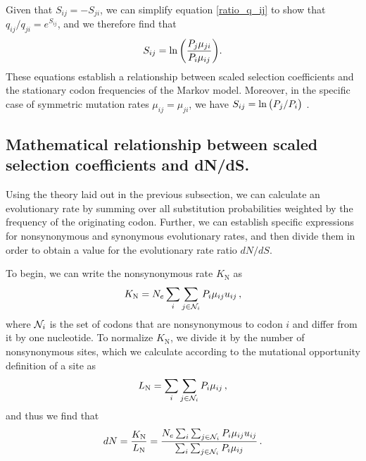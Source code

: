 \documentclass[11pt]{article}
\begin{document}
Given that $S_{ij} = -S_{ji}$, we can simplify equation \eqref{ratio_q_ij} to show that $q_{ij}/q_{ji} = e^{S_{ij}}$, and we therefore find that
\begin{equation}\label{eq:s_pmu}
S_{ij} = \ln\bigg{(} \frac{P_j\mu_{ji}}{P_i\mu_{ij}} \bigg{)}. 
\end{equation}
These equations establish a relationship between scaled selection coefficients and the stationary codon frequencies of the Markov model. Moreover, in the specific case of symmetric mutation rates $\mu_{ij} = \mu_{ji}$, we have $S_{ij} = \ln\big{(}P_j/P_i\big{)}$ \cite{SellaHirsh2005}. 


		
\subsection*{Mathematical relationship between scaled selection coefficients and dN/dS.} 

Using the theory laid out in the previous subsection, we can calculate an evolutionary rate by summing over all substitution probabilities weighted by the frequency of the originating codon. Further, we can establish specific expressions for nonsynonymous and synonymous evolutionary rates, and then divide them in order to obtain a value for the evolutionary rate ratio $dN/dS$.

To begin, we can write the nonsynonymous rate $K_\text{N}$ as 
\begin{equation}\label{eq:KN}
	K_\text{N} = N_e \sum_i \sum_{j \in {\cal N}_i} P_i \mu_{ij} u_{ij} \,,
\end{equation}
where ${\cal N}_i$ is the set of codons that are nonsynonymous to codon $i$ and differ from it by one nucleotide. To normalize $K_\text{N}$, we divide it by the number of nonsynonymous sites, which we calculate according to the mutational opportunity definition of a site \cite{GoldmanYang1994, Yang2006} as 
\begin{equation}\label{eq:LN}
	L_\text{N} = \sum_i \sum_{j \in {\cal N}_i} P_i \mu_{ij}\,, 
\end{equation} and thus we find that 
\begin{equation}\label{eq:dN}
	dN = \frac{K_\text{N}}{L_\text{N}}=\frac{N_e \sum_i \sum_{j \in {\cal N}_i} P_i \mu_{ij} u_{ij} } {\sum_i \sum_{j \in {\cal N}_i}P_i \mu_{ij}}\,.
\end{equation}
		
\end{document}
